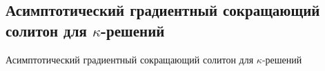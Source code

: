 \subsection{\texorpdfstring{Асимптотический градиентный сокращающий солитон для $\kappa$-решений}{Асимптотический градиентный сокращающий солитон для κ-решений}}
Асимптотический градиентный сокращающий солитон для $\kappa$-решений